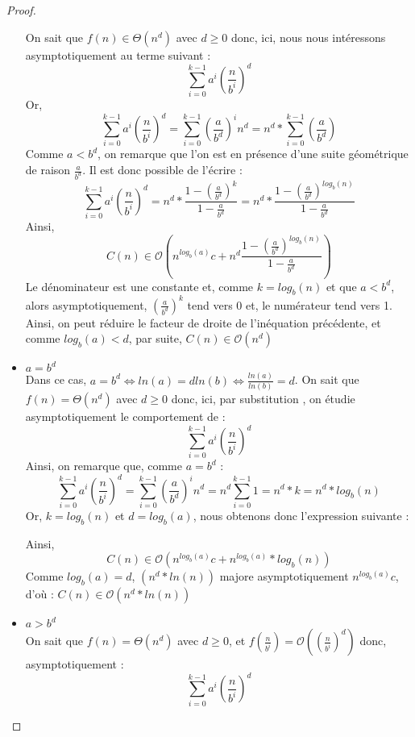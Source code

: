 \documentclass[a4paper,10pt]{article}
\begin{document}
\begin{proof}
\begin{itemize}
On sait que $f(n) \in \Theta (n^d)$ avec $d \geq 0$ donc, ici, nous nous intéressons asymptotiquement au terme suivant :
\begin{equation}
	\sum_{i=0}^{k-1}a^i(\frac{n}{b^i})^d
\end{equation}
Or, 
\begin{equation}
\sum_{i=0}^{k-1}a^i(\frac{n}{b^i})^d = \sum_{i=0}^{k-1}(\frac{a}{b^d})^in^d = n^d * \sum_{i=0}^{k-1}(\frac{a}{b^d})
\end{equation}
Comme $a<b^d$, on remarque que l'on est en présence d'une suite géométrique de raison $\frac{a}{b^d}$. Il est donc possible de l'écrire :
\begin{equation}
\sum_{i=0}^{k-1}a^i(\frac{n}{b^i})^d = n^d * \frac{1 - (\frac{a}{b^d})^k}{1 - \frac{a}{b^d}} = n^d * \frac{1 - (\frac{a}{b^d})^{log_{b}(n)}}{1 - \frac{a}{b^d}}
\end{equation}
Ainsi,
\begin{equation}
C(n) \in \mathcal{O}(n^{log_{b}(a)}c+n^d\frac{1-(\frac{a}{b^d})^{{log_{b}(n)}}}{1-\frac{a}{b^d}})
\end{equation}
Le dénominateur est une constante et, comme $k = log_{b}(n)$ et que $a<b^d$, alors asymptotiquement, $(\frac{a}{b^d})^k$ tend vers 0 et, le numérateur tend vers 1. Ainsi, on peut réduire le facteur de droite de l'inéquation précédente,  et comme $log_{b}(a) < d$, par suite, $C(n) \in \mathcal{O}(n^{d})$\\

  \item $a=b^d$ \\
	Dans ce cas, $a=b^d \Leftrightarrow ln(a) = dln(b) \Leftrightarrow \frac{ln(a)}{ln(b)} = d $. 
On sait que $f(n) = \Theta (n^d)$ avec $d \geq 0$ donc, ici, par substitution , on étudie asymptotiquement le comportement de :
	$$\sum_{i=0}^{k-1}a^i(\frac{n}{b^i})^d$$
Ainsi, on remarque que, comme $a=b^d$ :
$$\sum_{i=0}^{k-1}a^i(\frac{n}{b^i})^d = \sum_{i=0}^{k-1}(\frac{a}{b^d})^in^d = n^d\sum_{i=0}^{k-1}1 = n^d*k = n^d*log_{b}(n) $$
Or, $k = log_{b}(n)$ et $ d = log_{b}(a) $, nous obtenons donc l'expression suivante :

Ainsi,
\begin{equation}
C(n) \in \mathcal{O}(n^{log_{b}(a)}c+n^{log_{b}(a)}*log_{b}(n))
\end{equation} 
Comme $log_{b}(a) = d$, $(n^{d}*ln(n))$ majore asymptotiquement $n^{log_{b}(a)}c$, d'où :  $C(n) \in \mathcal{O}(n^{d}*ln(n))$\\

  \item $a>b^d$ \\
On sait que $f(n) = \Theta (n^d)$ avec $d \geq 0$, et $f(\frac{n}{b^i}) = \mathcal{O}((\frac{n}{b^i})^d)$ donc, asymptotiquement :
\begin{equation}
	\sum_{i=0}^{k-1}a^i(\frac{n}{b^i})^d 
\end{equation}


\end{itemize}
\end{proof}
\end{document}

